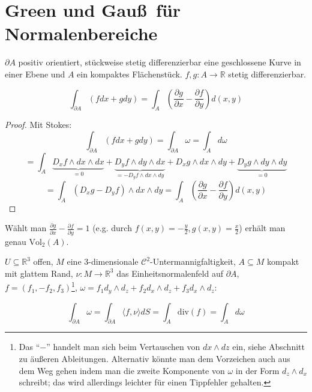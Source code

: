 \section{Green und Gau\ss \, f\"ur Normalenbereiche}
\begin{theorem}[Green]
	$\partial A$ positiv orientiert, st\"uckweise stetig differenzierbar eine geschlossene Kurve in einer Ebene und $A$ ein kompaktes Fl\"achenst\"uck. $f,g:A\rightarrow\mathbb R$ stetig differenzierbar.
	
	$$\int_{\partial A} (fdx+gdy) = \int_A \left(\frac{\partial g}{\partial x} - \frac{\partial f}{\partial y}\right)d(x,y)$$
\end{theorem}
\begin{proof}
	Mit Stokes:
	$$\int_{\partial A} (fdx+gdy) = \int_{\partial A}\omega = \int_A d\omega $$
	$$= \int_A \underbrace{D_x f\wedge dx\wedge dx}_{=0} + \underbrace{D_y f\wedge dy\wedge dx}_{=-D_y f\wedge dx\wedge dy}+D_x g\wedge dx\wedge dy + \underbrace{D_y g\wedge dy\wedge dy}_{=0}$$
	$$= \int_A (D_x g- D_yf)\wedge dx\wedge dy = \int_A \left(\frac{\partial g}{\partial x} - \frac{\partial f}{\partial y}\right)d(x,y)$$
\end{proof}

\begin{remark}[Spezialfall]
	W\"ahlt man $\frac{\partial g}{\partial x} - \frac{\partial f}{\partial y}=1$ (e.g. durch $f(x,y)=-\frac{y}{2}, g(x,y)=\frac{x}{2}$) erh\"alt man genau $\text{Vol}_2(A)$.
\end{remark}


\begin{theorem}[Gau\ss]
	$U\subseteq \mathbb R^3$ offen, $M$ eine $3$-dimensionale $\mathcal C^2$-Untermannigfaltigkeit, $A\subseteq M$ kompakt mit glattem Rand, $\nu:M\rightarrow\mathbb R^3$ das Einheitsnormalenfeld auf $\partial A$, $f=(f_1,-f_2,f_3)$\footnote{Das ``$-$'' handelt man sich beim Vertauschen von $dx\wedge dz$ ein, siehe Abschnitt zu \"au\ss eren Ableitungen. Alternativ k\"onnte man dem Vorzeichen auch aus dem Weg gehen indem man die zweite Komponente von $\omega$ in der Form $d_z\wedge d_x$ schreibt; das wird allerdings leichter f\"ur einen Tippfehler gehalten.}, $\omega = f_1 d_y\wedge d_z+f_2 d_x\wedge d_z+ f_3 d_x\wedge d_z$:
	
	$$\int_{\partial A}\omega = \boxed{\int_{\partial A}\langle f,\nu \rangle dS = \int_A \text{div}(f)} = \int_A d\omega$$
\end{theorem}












